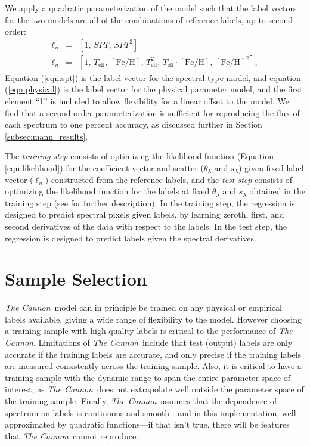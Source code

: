 \documentclass[twocolumn]{aastex62}
\newcommand{\thecannon}{\textsl{The Cannon}}
\newcommand{\teff}{T_{\mathrm{eff}}}
\newcommand{\feh}{[{\mathrm{Fe}/\mathrm{H}}]}
\begin{document}
We apply a quadratic parameterization of the model such that the label vectors for the two models are all of the combinations of reference labels, up to second order:
\begin{eqnarray}
\ell_{n} &=& [1, \, SPT, \, SPT^{2}] \label{eqn:spt}
\\
\ell_{n} &=& [1, \, \teff, \, \feh, \, \teff^2, \, \teff \cdot \feh, \, \feh^{2}] \label{eqn:physical}
,
\end{eqnarray}
Equation (\ref{eqn:spt}) is the label vector for the spectral type model, and equation (\ref{eqn:physical}) is the label vector for the physical parameter model, and the first element ``1'' is included to allow flexibility for a linear offset to the model. We find that a second order parameterization is sufficient for reproducing the flux of each spectrum to one percent accuracy, as discussed further in Section \ref{subsec:mann_results}.

The \emph{training step} consists of optimizing the likelihood function (Equation \ref{eqn:likelihood}) for the coefficient vector and scatter ($\theta_{\lambda}$ and $s_{\lambda}$) given fixed label vector (\emph{$\ell_n$}) constructed from the reference labels, and the \emph{test step} consists of optimizing the likelihood function for the labels at fixed $\theta_{\lambda}$ and $s_{\lambda}$ obtained in the training step (see \citealt{Ness:2015} for further description). 
In the training step, the regression is designed to predict spectral pixels
given labels, by learning zeroth, first, and second derivatives of the data with respect to
the labels. In the test step, the regression is designed to predict labels given the spectral
derivatives. \\
 

\section{Sample Selection} \label{sec:sample_selection}

\thecannon\ model can in principle be trained on any physical or empirical labels available, giving a wide range of flexibility to the model. However choosing a training sample with high quality labels is critical to the performance of \thecannon.
Limitations of \thecannon\ include that test (output) labels are only accurate if the training labels are accurate, and only precise if the training labels are measured consistently across the training sample.
Also, it is critical to have a training sample with the dynamic range to span the entire parameter space of interest, as \thecannon\ does not extrapolate well outside the parameter space of the training sample.
Finally, \thecannon\ assumes that the dependence of spectrum on labels is continuous and smooth---and in this implementation, well approximated by quadratic functions---if that isn't true, there will be features that \thecannon\ cannot reproduce.
\end{document}
